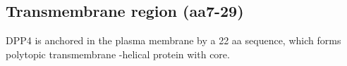 \subsection{Transmembrane region (aa7-29)}

DPP4 is anchored in the plasma membrane by a 22 aa sequence, which forms polytopic transmembrane \alpha-helical protein with core. \cite{Hong_1990}
